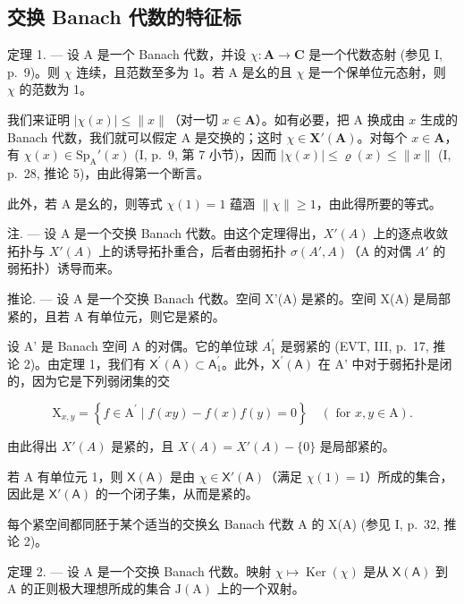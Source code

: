 \subsection{交换 Banach 代数的特征标}

定理 1. --- 设 A 是一个 Banach 代数，并设 \(\chi\colon\mathbf{A}\to\mathbf{C}\) 是一个代数态射 (参见 I, p.~9)。则 \(\chi\) 连续，且范数至多为 1。若 A 是幺的且 \(\chi\) 是一个保单位元态射，则 \(\chi\) 的范数为 1。

我们来证明 \(|\chi(x)| \leqslant \|x\|\)（对一切 \(x \in \mathbf{A}\)）。如有必要，把 A 换成由 \(x\) 生成的 Banach 代数，我们就可以假定 A 是交换的；这时 \(\chi \in \mathbf{X}'(\mathbf{A})\)。对每个 \(x \in \mathbf{A}\)，有 \(\chi(x) \in \mathrm{Sp}_{\mathrm{A}}'(x)\) (I, p.~9, 第 7 小节)，因而 \(|\chi(x)| \leqslant \varrho(x) \leqslant \|x\|\) (I, p.~28, 推论 5)，由此得第一个断言。

此外，若 A 是幺的，则等式 \(\chi(1)=1\) 蕴涵 \(\|\chi\|\geqslant1\)，由此得所要的等式。

注. --- 设 A 是一个交换 Banach 代数。由这个定理得出，\(X'(A)\) 上的逐点收敛拓扑与 \(X'(A)\) 上的诱导拓扑重合，后者由弱拓扑 \(\sigma(A', A)\)（A 的对偶 \(A'\) 的弱拓扑）诱导而来。

推论. --- 设 A 是一个交换 Banach 代数。空间 X'(A) 是紧的。空间 X(A) 是局部紧的，且若 A 有单位元，则它是紧的。

设 A' 是 Banach 空间 A 的对偶。它的单位球 \(A_{1}^{\prime}\) 是弱紧的 (EVT, III, p.~17, 推论 2)。由定理 1，我们有 \(\mathsf{X}^{\prime}(\mathsf{A}) \subset \mathsf{A}_{1}^{\prime}\)。此外，\(\mathsf{X}^{\prime}(\mathsf{A})\) 在 A' 中对于弱拓扑是闭的，因为它是下列弱闭集的交

\[
\mathrm{X} _ {x, y} = \left\{f \in \mathrm{A} ^ {\prime} \mid f (x y) - f (x) f (y) = 0 \right\} \quad (\text { for } x, y \in \mathrm{A}).
\]

由此得出 \(X'(A)\) 是紧的，且 \(X(A) = X'(A) - \{0\}\) 是局部紧的。

若 A 有单位元 1，则 \(\mathsf{X}(\mathsf{A})\) 是由 \(\chi \in \mathsf{X}'(\mathsf{A})\)（满足 \(\chi(1) = 1\)）所成的集合，因此是 \(\mathsf{X}'(\mathsf{A})\) 的一个闭子集，从而是紧的。

每个紧空间都同胚于某个适当的交换幺 Banach 代数 A 的 X(A) (参见 I, p.~32, 推论 2)。

定理 2. --- 设 A 是一个交换 Banach 代数。映射 \(\chi \mapsto \operatorname{Ker}(\chi)\) 是从 \(\mathsf{X}(\mathsf{A})\) 到 A 的正则极大理想所成的集合 \(\mathrm{J}(\mathrm{A})\) 上的一个双射。

